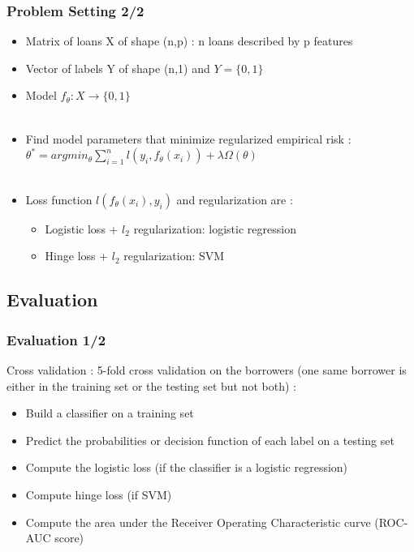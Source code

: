\documentclass[10pt,handout,english]{beamer}
\begin{document}
		\begin{frame}
		\frametitle{Problem Setting 2/2}
			\begin{itemize}
				\item Matrix of loans X  of shape (n,p) : n loans described by p features
				\item Vector of labels Y of shape (n,1) and $Y = \{0, 1\}$
				\item Model $f_\theta:X\rightarrow\{0,1\}$\\~\\
				\item Find model parameters that minimize regularized empirical risk :\\
				$\theta^*=argmin_\theta\sum_{i=1}^n l(y_i,f_\theta(x_i)) + \lambda\Omega(\theta)$\\~\\
				\item Loss function $l(f_\theta(x_i),y_i)$ and regularization are :
				\begin{itemize}
					\item Logistic loss + $l_2$ regularization: logistic regression
					\item Hinge loss + $l_2$ regularization: SVM
				\end{itemize}
			\end{itemize}

		\end{frame}

		\subsection{Evaluation}
		\begin{frame}
		\frametitle{Evaluation 1/2}
			\begin{block}{Cross validation :}
				5-fold cross validation on the borrowers (one same borrower is either in the training set or the testing set but not both) :
				\begin{itemize}
					\item Build a classifier on a training set
					\item Predict the probabilities or decision function of each label on a testing set
					\item Compute the logistic loss (if the classifier is a logistic regression)
					\item Compute hinge loss (if SVM)
					\item Compute the area under the Receiver Operating Characteristic curve (ROC-AUC score)
				\end{itemize}
			\end{block}
		\end{frame}
\end{document}
